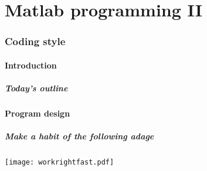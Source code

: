 \part{Matlab programming II}
\section{Coding style}
\subsection*{Introduction}
\begin{frame}[label=contents_prog2]
  \frametitle{Today's outline}
\end{frame}

\subsection*{Program design}
\begin{frame}[label=workrightfast]
  \frametitle{Make a habit of the following adage}
  \begin{center}
    \texttt{[image: workrightfast.pdf]}
  \end{center}
\end{frame}

